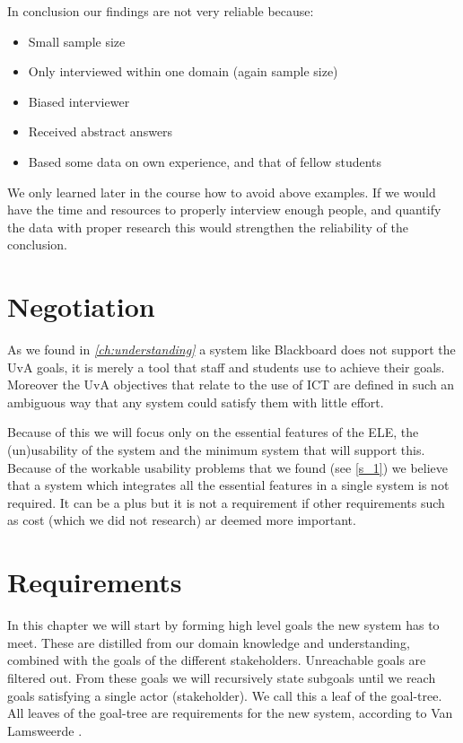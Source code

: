 In conclusion our findings are not very reliable because:
\begin{itemize}
	\item Small sample size
	\item Only interviewed within one domain (again sample size)
	\item Biased interviewer
	\item Received abstract answers
	\item Based some data on own experience, and that of fellow students
\end{itemize}
We only learned later in the course how to avoid above examples. If we would have the time and resources to properly interview enough people, and quantify the data with proper research this would strengthen the reliability of the conclusion.










\chapter{Negotiation}
As we found in \emph{\ref{ch:understanding} } a system like Blackboard does not support the UvA goals, it is merely a tool that staff and students use to achieve their goals. Moreover the UvA objectives that relate to the use of ICT are defined in such an ambiguous way that any system could satisfy them with little effort.

Because of this we will focus only on the essential features of the ELE, the (un)usability of the system and the minimum system that will support this. Because of the workable usability problems that we found (see \ref{s_1}) we believe that a system which integrates all the essential features in a single system is not required. It can be a plus but it is not a requirement if other requirements such as cost (which we did not research) ar deemed more important.


\chapter{Requirements}
In this chapter we will start by forming high level goals the new system has to meet. These are distilled from our domain knowledge and understanding, combined with the goals of the different stakeholders. Unreachable goals are filtered out. From these goals we will recursively state subgoals until we reach goals satisfying a single actor (stakeholder). We call this a leaf of the goal-tree. All leaves of the goal-tree are requirements for the new system, according to Van Lamsweerde \cite{RE_book}.

